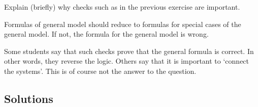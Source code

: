 \begin{exercise}[201904]
  Explain (briefly) why checks such as in the previous exercise are important.
\begin{solution}
    Formulas of general model should reduce to formulas for special cases of the general model. If not, the formula for the general model is wrong.

    Some students say that such checks prove that the general formula is correct.
    In other words, they reverse the logic.
    Others say that it is important to `connect the systems'.
    This is of course not the answer to the question.
\end{solution}
\end{exercise}




\subsection*{Solutions}




